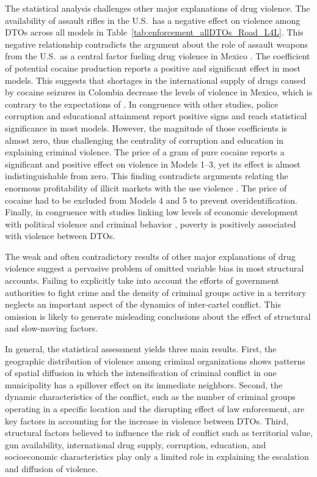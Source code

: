 \documentclass[12pt,letterpaper]{article}
\begin{document}
The statistical analysis challenges other major explanations of drug violence. The availability of assault rifles in the U.S.\ has a negative effect on violence among DTOs across all models in Table~\ref{tab:enforcement_allDTOs_Road_L4L}. This negative relationship contradicts the argument about the role of assault weapons from the U.S.\ as a central factor fueling drug violence in Mexico \citep{Dube2013}. The coefficient of potential cocaine production reports a positive and significant effect in most models. This suggests that shortages in the international supply of drugs caused by cocaine seizures in Colombia decrease the levels of violence in Mexico, which is contrary to the expectations of \citet{Castillo2014}. In congruence with other studies, police corruption and educational attainment report positive signs and reach statistical significance in most models. However, the magnitude of those coefficients is almost zero, thus challenging the centrality of corruption  \citep{Morris2012,Andreas1998,Shelley2001} and education \citep{Ingram2014} in explaining criminal violence. The price of a gram of pure cocaine reports a significant and positive effect on violence in Models 1--3, yet its effect is almost indistinguishable from zero. This finding contradicts arguments relating the enormous profitability of illicit markets with the use violence \citep{Kilmer2010}. The price of cocaine had to be excluded from Models 4 and 5 to prevent overidentification. Finally, in congruence with studies linking low levels of economic development with political violence \citep{Collier2004} and criminal behavior \citep{Fajnzylber2000a,Fajnzylber2002b}, poverty is positively associated with violence between DTOs.  

The weak and often contradictory results of other major explanations of drug violence suggest a pervasive problem of omitted variable bias in most structural accounts. Failing to explicitly take into account the efforts of government authorities to fight crime and the density of criminal groups active in a territory neglects an important aspect of the dynamics of inter-cartel conflict. This omission is likely to generate misleading conclusions about the effect of structural and slow-moving factors. 

In general, the statistical assessment yields three main results. First, the geographic distribution of violence among criminal organizations shows patterns of spatial diffusion in which the intensification of criminal conflict in one municipality has a spillover effect on its immediate neighbors. Second, the dynamic characteristics of the conflict, such as the number of criminal groups operating in a specific location and the disrupting effect of law enforcement, are key factors in accounting for the increase in violence between DTOs. Third, structural factors believed to influence the risk of conflict such as territorial value, gun availability, international drug supply, corruption, education, and socioeconomic characteristics play only a limited role in explaining the escalation and diffusion of violence. 
\end{document}
